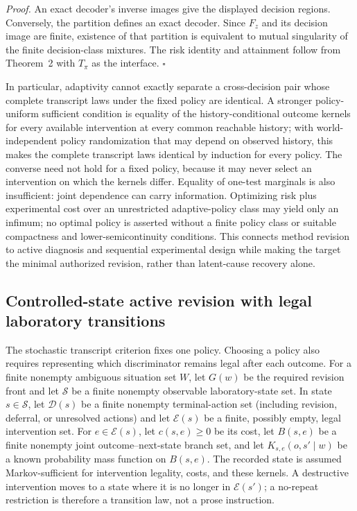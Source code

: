 \emph{Proof.} An exact decoder's inverse images give the displayed decision
regions. Conversely, the partition defines an exact decoder. Since $F_z$ and
its decision image are finite, existence of that partition is equivalent to
mutual singularity of the finite decision-class mixtures. The risk identity
and attainment follow from Theorem~2 with $T_\pi$ as the interface.
\hfill$\square$

In particular, adaptivity cannot exactly separate a cross-decision pair whose
complete transcript laws under the fixed policy are identical.  A stronger
policy-uniform sufficient condition is equality of the history-conditional
outcome kernels for every available intervention at every common reachable
history; with world-independent policy randomization that may depend on observed
history, this makes the complete
transcript laws identical by induction for every policy.  The converse need
not hold for a fixed policy, because it may never select an intervention on
which the kernels differ. Equality of one-test marginals is also insufficient:
joint dependence can carry information. Optimizing risk plus experimental cost
over an unrestricted adaptive-policy class may yield only an infimum; no
optimal policy is asserted without a finite policy class or suitable
compactness and lower-semicontinuity conditions. This connects method revision
to active diagnosis and sequential experimental design
\cite{reiter1987,dekleer1987,chernoff1959,golovin2011} while making the target
the minimal authorized revision, rather than latent-cause recovery alone.


\subsection{Controlled-state active revision with legal laboratory transitions}

The stochastic transcript criterion fixes one policy.  Choosing a policy also
requires representing which discriminator remains legal after each outcome.
For a finite nonempty ambiguous situation set $W$, let $G(w)$ be the required
revision front and let $\mathcal S$ be a finite nonempty observable
laboratory-state set.  In state $s\in\mathcal S$, let $\mathcal D(s)$ be a
finite nonempty terminal-action set (including revision, deferral, or unresolved
actions) and let $\mathcal E(s)$ be a finite, possibly empty, legal intervention
set.  For $e\in\mathcal E(s)$, let $c(s,e)\geq0$ be its cost, let $B(s,e)$ be a
finite nonempty joint outcome--next-state branch set, and let
$K_{s,e}(o,s'\mid w)$ be a known probability mass function on $B(s,e)$.  The
recorded state is assumed Markov-sufficient for intervention legality, costs,
and these kernels.  A destructive intervention moves to a state where it is no
longer in $\mathcal E(s')$; a
no-repeat restriction is therefore a transition law, not a prose instruction.

